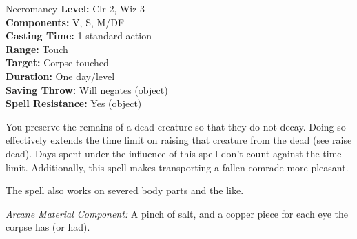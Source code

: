 {Necromancy}
{
	\textbf{Level:}
	Clr 2, Wiz 3\\
	\textbf{Components:}
	V, S, M/DF\\
	\textbf{Casting Time:}
	1 standard action\\
	\textbf{Range:}
	Touch\\
	\textbf{Target:}
	Corpse touched\\
	\textbf{Duration:}
	One day/level\\
	\textbf{Saving Throw:}
	Will negates (object)\\
	\textbf{Spell Resistance:}
	Yes (object)\\
}
{
	You preserve the remains of a dead creature so that they do not decay. Doing so effectively extends the time limit on raising that creature from the dead (see raise dead). Days spent under the influence of this spell don't count against the time limit. Additionally, this spell makes transporting a fallen comrade more pleasant.

	The spell also works on severed body parts and the like.

	\textit{Arcane Material Component:}
	A pinch of salt, and a copper piece for each eye the corpse has (or had).

}
